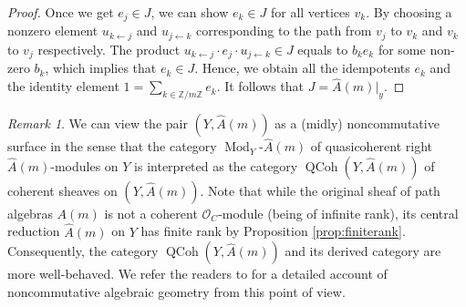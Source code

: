 \documentclass[11pt]{amsart}
\theoremstyle{plain}
\theoremstyle{definition}
\theoremstyle{remark}
\newtheorem{rem}[theorem]{Remark}
\def\O{\mathcal{O}}
\def\zm{\mathbb{Z}/m\mathbb{Z}}
\def\wAm{\widehat{A}(m)}
\def\QCoh{\operatorname{QCoh}}
\def\Mod{\operatorname{Mod}}
\begin{document}
\begin{proof}
 Once we get $e_j\in J$, we can show $e_k\in J$ for all vertices $v_k$. By choosing a nonzero element $u_{k\leftarrow j}$ and $u_{j\leftarrow k}$ corresponding to the path from $v_j$ to $v_k$ and $v_k$ to $v_j$ respectively. The product $u_{k\leftarrow j}\cdot e_j \cdot u_{j\leftarrow k}\in J$ equals to $b_k e_k$ for some non-zero $b_k$, which implies that $e_k\in J$. Hence, we obtain all the idempotents $e_k$ and the identity element $1 = \sum_{k\in \zm} e_k$. It follows that $J = \wAm|_y$. 
 
 
 
\end{proof}

\begin{rem}
We can view the pair $(Y, \wAm)$ as a (midly) noncommutative surface in the sense that the category $\Mod_Y\!\text{-}\wAm$ of quasicoherent right $\wAm$-modules on $Y$ is interpreted as the category $\QCoh(Y, \wAm)$ of coherent sheaves on $(Y, \wAm)$. Note that while the original sheaf of path algebras $A(m)$ is not a coherent $\O_C$-module (being of infinite rank), its central reduction $\wAm$ on $Y$ has finite rank by Proposition \ref{prop:finiterank}. Consequently, the category $\QCoh(Y, \wAm)$ and its derived category are more well-behaved. We refer the readers to \cite[Section 2]{kuznetsov-quadric}\cite[Appendix D]{kuznetsov-hyperplane} for a detailed account of noncommutative algebraic geometry from this point of view. 
\end{rem}
\end{document}
